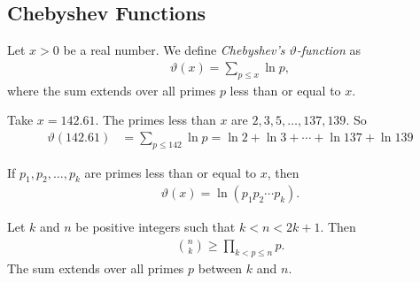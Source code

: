 
\subsection{Chebyshev Functions}
	\begin{definition}
		Let $x>0$ be a real number. We define \textit{Chebyshev's $\vartheta$-function} as
			\begin{align*}
				\vartheta(x)= \sum_{p \leq x} \ln p,
			\end{align*}
		where the sum extends over all primes $p$ less than or equal to $x$.
	\end{definition}
	
	\begin{example}
		Take $x=142.61$. The primes less than $x$ are $2, 3, 5, \ldots, 137, 139$. So
			\begin{align*}
				\vartheta(142.61)&=\sum_{p \leq 142} \ln p = \ln 2 + \ln 3 + \cdots + \ln 137 + \ln 139
			\end{align*}
	\end{example}
	
	\begin{corollary}
		If $p_1, p_2, \ldots, p_k$ are primes less than or equal to $x$, then
			\begin{align*}
			\vartheta(x)= \ln \left( p_1p_2\cdots p_k\right).
			\end{align*}			
	\end{corollary}
	
	\begin{lemma}
		\label{lem:binomialprimeinequality}
		Let $k$ and $n$ be positive integers such that $k<n < 2k+1 $. Then
			\begin{align*}
				\binom{n}{k} \geq \prod_{k < p \leq n} p.
			\end{align*}
		The sum extends over all primes $p$ between $k$ and $n$.
	\end{lemma}
	
